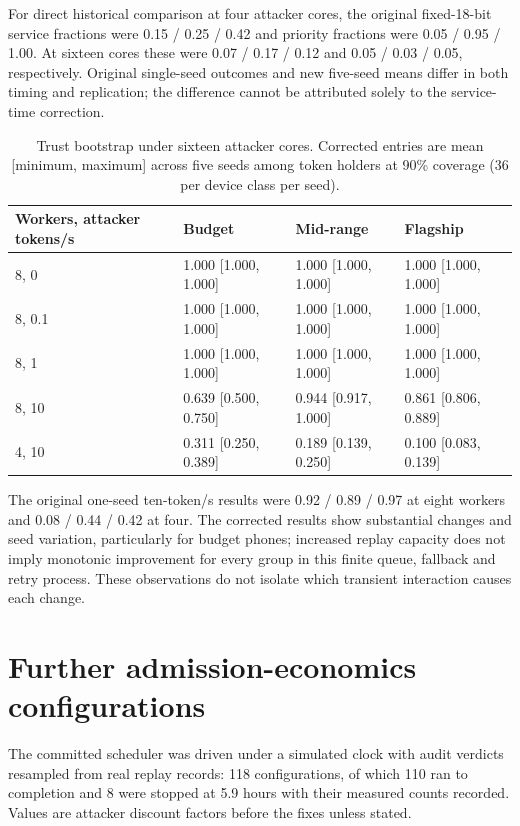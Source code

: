 \documentclass[11pt]{article}
\newcommand{\botrule}{\bottomrule}
\begin{document}
For direct historical comparison at four attacker cores, the original fixed-18-bit service fractions were 0.15 / 0.25 / 0.42 and priority fractions were 0.05 / 0.95 / 1.00. At sixteen cores these were 0.07 / 0.17 / 0.12 and 0.05 / 0.03 / 0.05, respectively. Original single-seed outcomes and new five-seed means differ in both timing and replication; the difference cannot be attributed solely to the service-time correction.

\begin{table}[htbp]
\caption{Trust bootstrap under sixteen attacker cores. Corrected entries are mean [minimum, maximum] across five seeds among token holders at 90\% coverage (36 per device class per seed).}
\centering
\small
\begin{tabularx}{\textwidth}{XXXX}
\toprule
Workers, attacker tokens/s & Budget & Mid-range & Flagship \\
\midrule
8, 0 & 1.000 [1.000, 1.000] & 1.000 [1.000, 1.000] & 1.000 [1.000, 1.000] \\
8, 0.1 & 1.000 [1.000, 1.000] & 1.000 [1.000, 1.000] & 1.000 [1.000, 1.000] \\
8, 1 & 1.000 [1.000, 1.000] & 1.000 [1.000, 1.000] & 1.000 [1.000, 1.000] \\
8, 10 & 0.639 [0.500, 0.750] & 0.944 [0.917, 1.000] & 0.861 [0.806, 0.889] \\
4, 10 & 0.311 [0.250, 0.389] & 0.189 [0.139, 0.250] & 0.100 [0.083, 0.139] \\
\botrule
\end{tabularx}
\end{table}

The original one-seed ten-token/s results were 0.92 / 0.89 / 0.97 at eight workers and 0.08 / 0.44 / 0.42 at four. The corrected results show substantial changes and seed variation, particularly for budget phones; increased replay capacity does not imply monotonic improvement for every group in this finite queue, fallback and retry process. These observations do not isolate which transient interaction causes each change.

\section{Further admission-economics configurations}

The committed scheduler was driven under a simulated clock with audit verdicts resampled from real replay records: 118 configurations, of which 110 ran to completion and 8 were stopped at 5.9 hours with their measured counts recorded. Values are attacker discount factors before the fixes unless stated.
\end{document}
